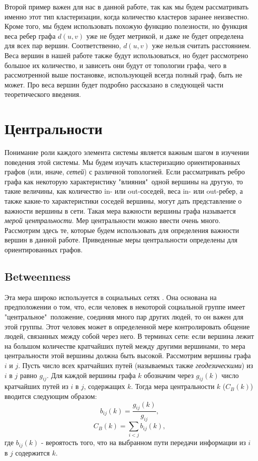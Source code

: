 Второй пример важен для нас в данной работе, так как мы будем рассматривать именно этот тип кластеризации, когда количество кластеров заранее неизвестно. Кроме того, мы будем использовать похожую функцию полезности, но функция веса ребер графа $d(u, v)$ уже не будет метрикой, и даже не будет определена для всех пар вершин. Соответственно, $d(u, v)$ уже нельзя считать расстоянием. Веса вершин в нашей работе также будут использоваться, но будет рассмотрено большое их количество, и зависеть они будут от топологии графа, чего в рассмотренной выше постановке, использующей всегда полный граф, быть не может. Про веса вершин будет подробно рассказано в следующей части теоретического введения. 

\section{Центральности}

Понимание роли каждого элемента системы является важным шагом в изучении поведения этой системы. Мы будем изучать кластеризацию ориентированных графов (или, иначе, \textit{сетей}) с различной топологией. Если рассматривать ребро графа как некоторую характеристику "влияния"\ одной вершины на другую, то такие величины, как количество in- или out-соседей, веса in- или out-ребер, а также какие-то характеристики соседей вершины, могут дать представление о важности вершины в сети. Такая мера важности вершины графа называется \textit{мерой центральности}. Мер центральности можно ввести очень много. Рассмотрим здесь те, которые будем использовать для определения важности вершин в данной работе. Приведенные меры центральности определены для ориентированных графов.

\subsection{Betweenness}
Эта мера широко используется в социальных сетях \cite{betweenness}. Она основана на предположении о том, что, если человек в некоторой социальной группе имеет "центральное"\ положение, соединяя много пар других людей, то он важен для этой группы. Этот человек может в определенной мере контролировать общение людей, связанных между собой через него. В терминах сети: если вершина лежит на большом количестве кратчайших путей между другими вершинами, то мера центральности этой вершины должна быть высокой. Рассмотрим вершины графа $i$ и $j$. Пусть число всех кратчайших путей (называемых также \textit{геодезическими}) из $i$ в $j$ равно $g_{ij}$. Для каждой вершины графа $k$ обозначим через $g_{ij}(k)$ число кратчайших путей из $i$ в $j$, содержащих $k$. Тогда мера центральности $k$ ($C_B(k)$) вводится следующим образом:
	\begin{equation}
	b_{ij}(k) = \frac{g_{ij}(k)}{g_{ij}},
	\end{equation}
	\begin{equation}
	C_B(k) = \sum_{i<j}b_{ij}(k),
	\end{equation}
	где $b_{ij}(k)$ - вероятость того, что на выбранном пути передачи информации из $i$ в $j$ содержится $k$. 
	
